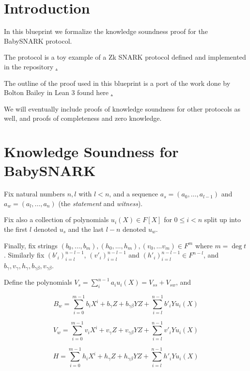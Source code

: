 




\chapter*{Introduction}\label{chap:intro}

In this blueprint we formalize the knowledge soundness proof for the BabySNARK protocol. 

The protocol is a toy example of a Zk SNARK protocol defined and implemented in the repository \href{https://github.com/initc3/babySNARK}. 

The outline of the proof used in this blueprint is a port of the work done by Bolton Bailey in Lean 3 found here \href{https://github.com/BoltonBailey/formal-snarks-project/}. 

We will eventually include proofs of knowledge soundness for other protocols as well, and proofs of completeness and zero knowledge. 

\chapter{Knowledge Soundness for BabySNARK}\label{chap:test2}

Fix natural numbers $n, l$ with $l < n$, and a sequence $a_s = (a_0, \ldots, a_{l-1})$ and $a_w = (a_l, \ldots, a_n)$ (the \emph{statement} and \emph{witness}). 

Fix also a collection of polynomials $u_i(X) \in F[X]$ for $0 \leq i < n$ split up into the first $l$ denoted $u_s$ and the last $l-n$ denoted $u_w$. 

Finally, fix strings $(b_0, \ldots,b_m), (h_0, \ldots, h_m), (v_0, \ldots v_m) \in F^m$ where $m = \deg t$. Similarly fix $(b'_i)_{i = l}^{n - l - 1}$, $(v'_i)_{i = l}^{n - l - 1}$ and $(h'_i)_{i = l}^{n - l - 1} \in F^{n-l}$, and $b_\gamma, v_\gamma, h_\gamma, b_{\gamma\beta}, v_{\gamma\beta}$.

\begin{definition}\label{def:V_B_H}
\leanok
Define the polynomials $V_s = \sum_i^{n-1} a_i u_i(X) = V_{ss} + V_{sw}$, and 

\[
B_w = \sum_{i = 0}^{m - 1} b_i X^i + b_{\gamma}Z + b_{\gamma \beta}YZ + \sum_{i = l}^{n - 1} b'_{i} Y u_{i}(X)
\]

\[
V_w = \sum_{i = 0}^{m - 1} v_i X^i + v_{\gamma}Z + v_{\gamma \beta}YZ + \sum_{i = l}^{n - 1} v'_{i} Y u_{i}(X)
\]

\[
H = \sum_{i = 0}^{m - 1} h_i X^i + h_{\gamma}Z + h_{\gamma \beta}YZ + \sum_{i = l}^{n - 1} h'_{i} Y u_{i}(X)
\]
\end{definition}

